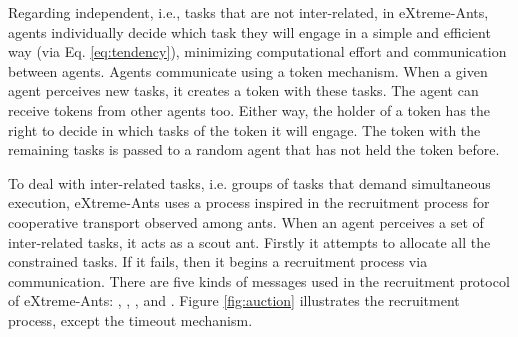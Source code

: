 %

Regarding independent, i.e., tasks that are not inter-related, in eXtreme-Ants, agents individually decide which task they will engage in a simple and efficient way (via Eq. \ref{eq:tendency}), minimizing computational effort and communication between agents. Agents communicate using a token mechanism. When a given agent perceives new tasks, it creates a token with these tasks. The agent can receive tokens from other agents too. Either way, the holder of a token has the right to decide in which tasks of the token it will engage. The token with the remaining tasks is passed to a random agent that has not held the token before. %

%
%

To deal with inter-related tasks, i.e. groups of tasks that demand simultaneous execution, eXtreme-Ants uses a process inspired in the recruitment process for cooperative transport observed among ants. When an agent perceives a set of inter-related tasks, it acts as a scout ant. Firstly it attempts to allocate all the constrained tasks. If it fails, then it begins a recruitment process via communication. There are five kinds of messages used in the recruitment protocol of eXtreme-Ants: , , ,  and . Figure \ref{fig:auction} illustrates the recruitment process, except the timeout mechanism. %


